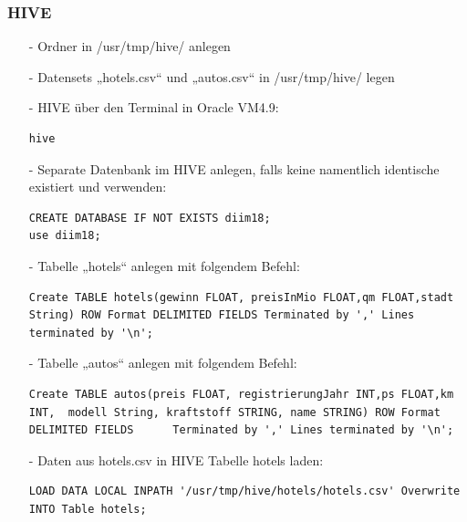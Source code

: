 \subsubsection*{HIVE}
\begin{itemize}
\item[-] Ordner in /usr/tmp/hive/ anlegen
\item[-] Datensets „hotels.csv“ und „autos.csv“  in /usr/tmp/hive/ legen
\item[-] HIVE über den Terminal in Oracle VM4.9:

\begin{lstlisting}
hive
\end{lstlisting}

\item[-] Separate Datenbank im HIVE anlegen, falls keine namentlich identische existiert und verwenden:
\begin{lstlisting}
CREATE DATABASE IF NOT EXISTS diim18;
use diim18;
\end{lstlisting}

\item[-] Tabelle „hotels“ anlegen mit folgendem Befehl:
\begin{lstlisting}
Create TABLE hotels(gewinn FLOAT, preisInMio FLOAT,qm FLOAT,stadt String) ROW Format DELIMITED FIELDS Terminated by ',' Lines terminated by '\n';
\end{lstlisting}

\item[-] Tabelle „autos“ anlegen mit folgendem Befehl:
\begin{lstlisting}
Create TABLE autos(preis FLOAT, registrierungJahr INT,ps FLOAT,km INT,  modell String, kraftstoff STRING, name STRING) ROW Format DELIMITED FIELDS      Terminated by ',' Lines terminated by '\n';
\end{lstlisting}

\item[-] Daten aus hotels.csv in HIVE Tabelle hotels laden:
\begin{lstlisting}
LOAD DATA LOCAL INPATH '/usr/tmp/hive/hotels/hotels.csv' Overwrite INTO Table hotels;
\end{lstlisting}


\end{itemize}
